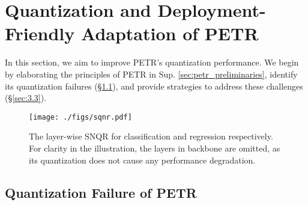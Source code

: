 \section{Quantization and Deployment-Friendly Adaptation of PETR}
\label{sec:method}

In this section, we aim to improve PETR's quantization performance. 
We begin by elaborating the principles of PETR in Sup. \ref{sec:petr_preliminaries}, 
identify its quantization failures (\S\ref{sec:quantization_failure_of_petr}), and provide strategies to address these challenges (\S\ref{sec:3.3}).


\begin{figure*}
\centering
	\texttt{[image: ./figs/sqnr.pdf]}
    \vspace{-0.3cm}
	\caption{The layer-wise SNQR for classification and regression respectively. For clarity in the illustration, the layers in backbone are omitted, as its quantization does not cause any performance degradation.}
	\label{fig:ASQNR}
    \vspace{-0.5cm}
\end{figure*}


\subsection{Quantization Failure of PETR}
\label{sec:quantization_failure_of_petr}


